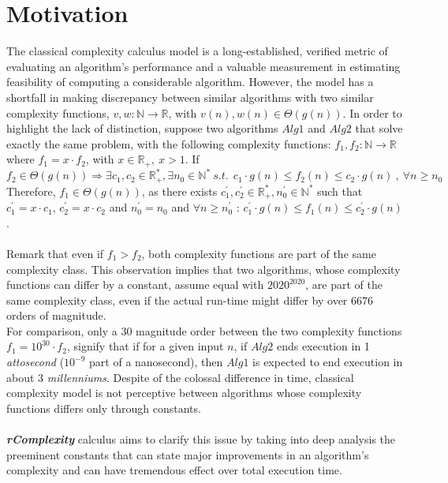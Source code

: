 \section{Motivation}
The classical complexity calculus model is a long-established, verified metric of evaluating an algorithm's performance and a valuable measurement in estimating feasibility of computing a considerable algorithm. However, the model has a shortfall in making discrepancy between similar algorithms with two similar complexity functions, $v,w:\mathbb{N}\longrightarrow\mathbb{R}$, with $v(n),w(n) \in \Theta(g(n))$. In order to highlight the lack of distinction, suppose two algorithms $Alg1$ and $Alg2$ that solve exactly the same problem, with the following complexity functions:
$f_{1},f_{2}:\mathbb{N}\longrightarrow\mathbb{R}$ where $f_{1} = x \cdot f_{2}$, with $x \in \mathbb{R}_{+}, \ x > 1$.
If \[ f_{2} \in \Theta(g(n)) \Rightarrow \exists c_{1}, c_{2} \in \mathbb{R}^{*}_{+}, \exists n_{0} \in \mathbb{N}^{*}\ s.t.\ \ c_{1} \cdot g(n) \leq f_{2}(n) \leq c_{2} \cdot g(n)\ ,\  \forall n \geq n_{0} \]
Therefore, $f_{1} \in \Theta(g(n))$, as there exists $ c_{1}^{'}, c_{2}^{'} \in \mathbb{R}^{*}_{+},  n_{0}^{'} \in \mathbb{N}^{*}$ such that $ c_{1}^{'} =  x \cdot c_{1} $, $ c_{2}^{'} =  x \cdot c_{2} $ and $n_{0}^{'} = n_{0}$ and  $\forall n \geq n_{0}^{'} $ :  $c_{1}^{'} \cdot g(n) \leq f_{1}(n) \leq c_{2}^{'} \cdot g(n)$.
\\ \\ 
Remark that even if $f_{1} > f_{2}$, both complexity functions are part of the same complexity class. This observation implies that two algorithms, whose complexity functions can differ by a constant, assume equal with $2020^{2020}$, are part of the same complexity class, even if the actual run-time might differ by over $6676$ orders of magnitude. 
\\ For comparison, only a $30$ magnitude order between the two complexity functions $f_{1} = 10^{30} \cdot f_{2}$, signify
that if for a given input $n$, if $Alg2$ ends execution in 1 \textit{attosecond} ($10^{-9}$ part of a nanosecond), then $Alg1$ is expected to end execution in about 3 \textit{millenniums}. Despite of the colossal difference in time, classical complexity model is not perceptive between algorithms whose complexity functions differs only through constants. \\ \\ 
\textbf{\textit{rComplexity}} calculus aims to clarify this issue by taking into deep analysis the preeminent constants that can state major improvements in an algorithm's complexity and can have tremendous effect over total execution time. 



